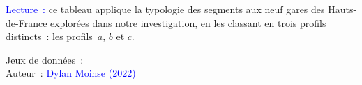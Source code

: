     \begin{table}[h!]
    \centering
    \renewcommand{\arraystretch}{1.5}
    \caption{Réutilisation du référentiel  appliqué aux neuf gares explorées dans la région Hauts-de-France.}
    \label{table-chap4:typologie-gares-hdf}
        \vspace{5pt}
        \begin{flushleft}\scriptsize{
        \textcolor{blue}{Lecture~:} ce tableau applique la typologie des segments aux neuf gares des Hauts-de-France explorées dans notre investigation, en les classant en trois profils distincts~: les profils~\(a\), \(b\) et \(c\).
        }\end{flushleft}
        \begin{flushright}\scriptsize
        Jeux de données~: \textcolor{blue}{\textcite{sncf_gares__connexions_gares_2024}}
        \\
        Auteur~: \textcolor{blue}{Dylan Moinse (2022)}
        \end{flushright}
        \end{table}